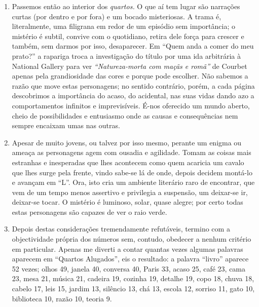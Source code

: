 \begin{enumerate}
\item Passemos então ao interior dos \emph{quartos. }O que aí tem lugar
são narrações curtas (por dentro e por fora) e um bocado misteriosas. A
trama é, literalmente, uma filigrana em redor de um episódio sem
importância; o mistério é subtil, convive com o quotidiano, retira dele
força para crescer e também, sem darmos por isso, desaparecer. Em
``Quem anda a comer do meu prato?'' a rapariga troca a investigação do
título por uma ida arbitrária à National Gallery para ver
\emph{``Natureza-morta com maçãs e romã''} de Courbet apenas pela grandiosidade
das cores e porque pode escolher. Não sabemos a razão que move estas
personagens; no sentido contrário, porém, a cada página descobrimos a
importância do acaso, do acidental, nas suas vidas dando azo a
comportamentos infinitos e imprevisíveis. É-nos oferecido um mundo
aberto, cheio de possibilidades e entusiasmo onde as causas e
consequências nem sempre encaixam umas nas outras.

\item Apesar de muito jovens, ou talvez por isso mesmo, perante um enigma ou
ameaça as personagens agem com ousadia e agilidade. Tomam as coisas mais
estranhas e inesperadas que lhes acontecem como quem acaricia um cavalo que lhes surge
pela frente, vindo sabe-se lá de onde, depois decidem montá-lo e avançam
em ``L''. Ora, isto cria um ambiente literário raro de encontrar, que
vem de um tempo menos assertivo e privilegia a suspensão, um deixar-se
ir, deixar-se tocar. O mistério é luminoso, solar, quase alegre; por
certo todas estas personagens são capazes de ver o raio verde.

\item Depois destas considerações tremendamente refutáveis, termino com a
objectividade própria dos números sem, contudo, obedecer a nenhum
critério em particular. Apenas me diverti a contar quantas vezes algumas
palavras aparecem em ``Quartos Alugados'', eis o resultado: a palavra
``livro'' aparece 52 vezes; olhos 49, janela 40, conversa 40, Paris 33,
acaso 25, café 23, cama 23, mesa 21, música 21, cadeira 19,
cozinha 19, detalhe 19, copo 18, chuva 18, cabelo 17, leis 15,
jardim 13, silêncio 13, chá 13, escola 12, sorriso 11, gato 10,
biblioteca 10, razão 10, teoria 9.
\end{enumerate}

\chapter{}

